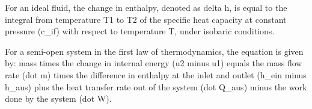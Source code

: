 For an ideal fluid, the change in enthalpy, denoted as delta h, is equal to the integral from temperature T1 to T2 of the specific heat capacity at constant pressure (c_if) with respect to temperature T, under isobaric conditions.

For a semi-open system in the first law of thermodynamics, the equation is given by:
mass times the change in internal energy (u2 minus u1) equals the mass flow rate (dot m) times the difference in enthalpy at the inlet and outlet (h_ein minus h_aus) plus the heat transfer rate out of the system (dot Q_aus) minus the work done by the system (dot W).